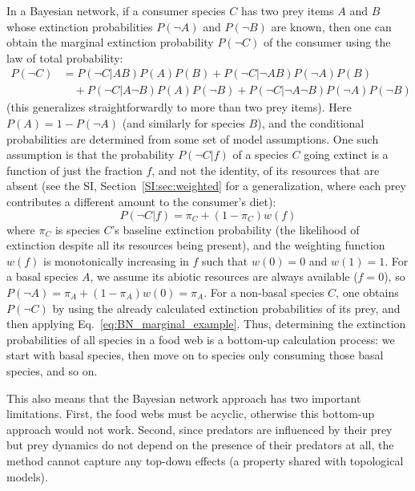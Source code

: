 \documentclass[11pt]{article}
\newcommand{\SI}{SI}
\begin{document}
\begin{mdframed}
In a Bayesian network, if a consumer species $C$ has two prey items $A$ and $B$ whose extinction probabilities $P(\neg A)$ and $P(\neg B)$ are known, then one can obtain the marginal extinction probability $P(\neg C)$ of the consumer using the law of total probability:
\begin{equation}
  \label{eq:BN_marginal_example}
  \tag{B1}
  \begin{split}
    P(\neg C) &= P(\neg C|A B)P(A)P(B) + P(\neg C|\neg A B)P(\neg A)P(B)
    \\ &\quad + P(\neg C|A \neg B)P(A)P(\neg B) + P(\neg C|\neg A \neg B)
    P(\neg A)P(\neg B)
  \end{split}
\end{equation}
(this generalizes straightforwardly to more than two prey items). Here $P(A) = 1 - P(\neg A)$ (and similarly for species $B$), and the conditional probabilities are determined from some set of model assumptions. One such assumption is that the probability $P(\neg C|f)$ of a species $C$ going extinct is a function of just the fraction $f$, and not the identity, of its resources that are absent (see the \SI, Section~\ref{SI:sec:weighted} for a generalization, where each prey contributes a different amount to the consumer's diet):
\begin{equation}
  \label{eq:BN_prob}
  \tag{B2}
  P(\neg C|f) = \pi_C + (1 - \pi_C) w(f)
\end{equation}
where $\pi_C$ is species $C$'s baseline extinction probability (the likelihood of extinction despite all its resources being present), and the weighting function $w(f)$ is monotonically increasing in $f$ such that $w(0)=0$ and $w(1)=1$. For a basal species $A$, we assume its abiotic resources are always available ($f=0$), so $P(\neg A) = \pi_A + (1 - \pi_A) w(0) = \pi_A$. For a non-basal species $C$, one obtains $P(\neg C)$ by using the already calculated extinction probabilities of its prey, and then applying Eq.~\ref{eq:BN_marginal_example}. Thus, determining the extinction probabilities of all species in a food web is a bottom-up calculation process: we start with basal species, then move on to species only consuming those basal species, and so on.

This also means that the Bayesian network approach has two important limitations. First, the food webs must be acyclic, otherwise this bottom-up approach would not work. Second, since predators are influenced by their prey but prey dynamics do not depend on the presence of their predators at all, the method cannot capture any top-down effects (a property shared with topological models).

\end{mdframed}
\end{document}
